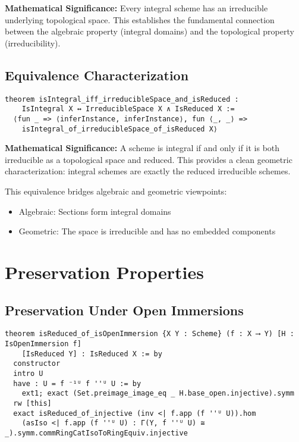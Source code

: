 \documentclass{article}
\theoremstyle{definition}
\begin{document}
\textbf{Mathematical Significance:} Every integral scheme has an irreducible underlying topological space. This establishes the fundamental connection between the algebraic property (integral domains) and the topological property (irreducibility).

\subsection{Equivalence Characterization}

\begin{lstlisting}
theorem isIntegral_iff_irreducibleSpace_and_isReduced :
    IsIntegral X ↔ IrreducibleSpace X ∧ IsReduced X :=
  ⟨fun _ => ⟨inferInstance, inferInstance⟩, fun ⟨_, _⟩ =>
    isIntegral_of_irreducibleSpace_of_isReduced X⟩
\end{lstlisting}

\textbf{Mathematical Significance:} A scheme is integral if and only if it is both irreducible as a topological space and reduced. This provides a clean geometric characterization: integral schemes are exactly the reduced irreducible schemes.

This equivalence bridges algebraic and geometric viewpoints:
\begin{itemize}
\item Algebraic: Sections form integral domains
\item Geometric: The space is irreducible and has no embedded components
\end{itemize}

\section{Preservation Properties}

\subsection{Preservation Under Open Immersions}

\begin{lstlisting}
theorem isReduced_of_isOpenImmersion {X Y : Scheme} (f : X ⟶ Y) [H : IsOpenImmersion f]
    [IsReduced Y] : IsReduced X := by
  constructor
  intro U
  have : U = f ⁻¹ᵁ f ''ᵁ U := by
    ext1; exact (Set.preimage_image_eq _ H.base_open.injective).symm
  rw [this]
  exact isReduced_of_injective (inv <| f.app (f ''ᵁ U)).hom
    (asIso <| f.app (f ''ᵁ U) : Γ(Y, f ''ᵁ U) ≅ _).symm.commRingCatIsoToRingEquiv.injective
\end{lstlisting}
\end{document}
